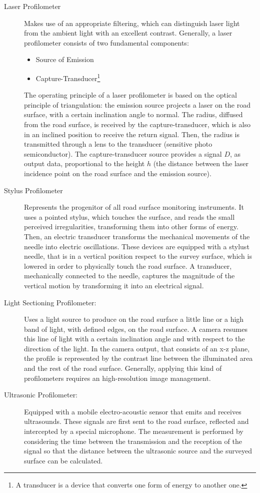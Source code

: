 \documentclass[tesi]{subfiles}
\begin{document}
\begin{enumerate}
\begin{description}
\item [Laser Profilometer] Makes use of an appropriate filtering, which can distinguish laser light from the ambient light with an excellent contrast. Generally, a laser profilometer consists of two fundamental components:
\begin{itemize}
\item Source of Emission
\item Capture-Transducer\footnote{A transducer is a device that converts one form of energy to another one.}
\end{itemize}
The operating principle of a laser profilometer is based on the optical principle of triangulation: the emission source projects a laser on the road surface, with a certain inclination angle to normal. The radius, diffused from the road surface, is received by the capture-transducer, which is also in an inclined position to receive the return signal. Then, the radius is transmitted through a lens to the transducer\cite{arnberg1991laser} (sensitive photo semiconductor). The capture-transducer source provides a signal $D$, as output data, proportional to the height $h$ (the distance between the laser incidence point on the road surface and the emission source).
\item [Stylus Profilometer] Represents the progenitor of all road surface monitoring instruments. It uses a pointed stylus, which touches the surface, and reads the small perceived irregularities, transforming them into other forms of energy. Then, an electric transducer transforms the mechanical movements of the needle into electric oscillations. These devices are equipped with a stylust needle, that is in a vertical position respect to the survey surface, which is lowered in order to physically touch the road surface. A transducer, mechanically connected to the needle, captures the magnitude of the vertical motion by transforming it into an electrical signal.
\item [Light Sectioning Profilometer:] Uses a light source to produce on the road surface a little line or a high band of light, with defined edges, on the road surface. A camera resumes this line of light with a certain inclination angle and with respect to the direction of the light. In the camera output, that consists of an x-z plane, the profile is represented by the contrast line between the illuminated area and the rest of the road surface. Generally, applying this kind of profilometers requires an high-resolution image management.
\item [Ultrasonic Profilometer:] Equipped with a mobile electro-acoustic sensor that emits and receives ultrasounds. These signals are first sent to the road surface, reflected and intercepted by a special microphone. The measurement is performed by considering the time between the transmission and the reception of the signal so that the distance between the ultrasonic source and the surveyed surface can be calculated\cite{little_book}.
\end{description}

\end{enumerate}
\clearpage
\end{document}
